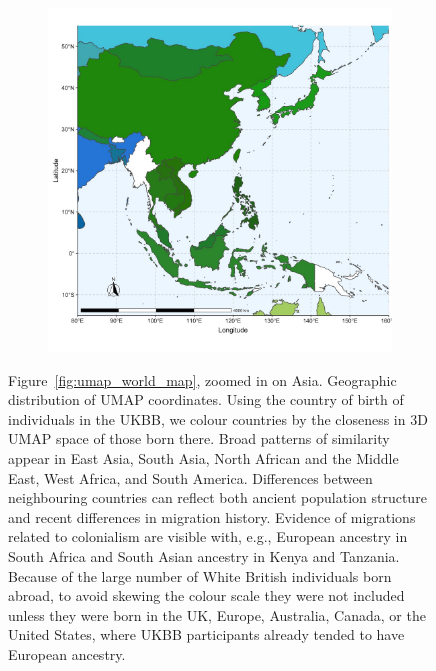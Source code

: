 \documentclass[12pt]{pnas-new}
\begin{document}
\begin{figure}
    \centering
    \begin{subfigure}{\textwidth}
    \includegraphics[width=\textwidth]{images/meanAsiaMap.jpg}
    \end{subfigure}
    \caption{Figure~\ref{fig:umap_world_map}, zoomed in on Asia. Geographic distribution of UMAP coordinates. Using the country of birth of individuals in the UKBB, we colour countries by the closeness in 3D UMAP space of those born there. Broad patterns of similarity appear in East Asia, South Asia, North African and the Middle East, West Africa, and South America. Differences between neighbouring countries can reflect both ancient population structure and recent differences in migration history. Evidence of migrations related to colonialism are visible with, e.g., European ancestry in South Africa and South Asian ancestry in Kenya and Tanzania. Because of the large number of White British individuals born abroad, to avoid skewing the colour scale they were not included unless they were born in the UK, Europe, Australia, Canada, or the United States, where UKBB participants already tended to have European ancestry.}
    \label{fig:supp_umap_ukbb_asia}
\end{figure}
\end{document}
